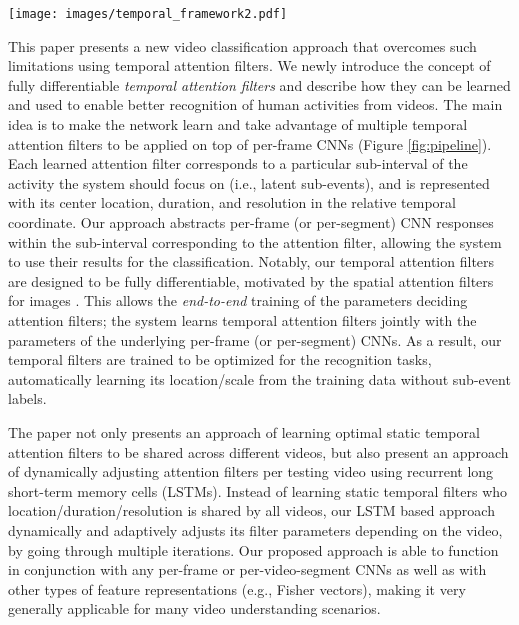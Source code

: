 \documentclass[letterpaper]{article}
\begin{document}
\begin{figure*}
\begin{center}
   \texttt{[image: images/temporal\_framework2.pdf]}
\end{center}
   \caption{Illustration of our overall recognition architecture with temporal attention filters. $M$ number of temporal filters are learned to focus on different temporal part of video frame features (i.e., latent sub-events). Each filter is composed of a set of Gaussian filters which take a weighted sum of local information. Outputs of the temporal filters are concatenated, and attached with a fully connected layers to perform video classification. }
\label{fig:pipeline}		
\end{figure*}










This paper presents a new video classification approach that overcomes such limitations using temporal attention filters. We newly introduce the concept of fully differentiable \emph{temporal attention filters} and describe how they can be learned and used to enable better recognition of human activities from videos. The main idea is to make the network learn and take advantage of multiple temporal attention filters to be applied on top of per-frame CNNs (Figure \ref{fig:pipeline}). Each learned attention filter corresponds to a particular sub-interval of the activity the system should focus on (i.e., latent sub-events), and is represented with its center location, duration, and resolution in the relative temporal coordinate. Our approach abstracts per-frame (or per-segment) CNN responses within the sub-interval corresponding to the attention filter, allowing the system to use their results for the classification. Notably, our temporal attention filters are designed to be fully differentiable, motivated by the spatial attention filters for images \cite{attention15}. This allows the \emph{end-to-end} training of the parameters deciding attention filters; the system learns temporal attention filters jointly with the parameters of the underlying per-frame (or per-segment) CNNs. As a result, our temporal filters are trained to be optimized for the recognition tasks, automatically learning its location/scale from the training data without sub-event labels.


The paper not only presents an approach of learning optimal static temporal attention filters to be shared across different videos, but also present an approach of dynamically adjusting attention filters per testing video using recurrent long short-term memory cells (LSTMs). Instead of learning static temporal filters who location/duration/resolution is shared by all videos, our LSTM based approach dynamically and adaptively adjusts its filter parameters depending on the video, by going through multiple iterations. Our proposed approach is able to function in conjunction with any per-frame or per-video-segment CNNs as well as with other types of feature representations (e.g., Fisher vectors), making it very generally applicable for many video understanding scenarios.
\end{document}
